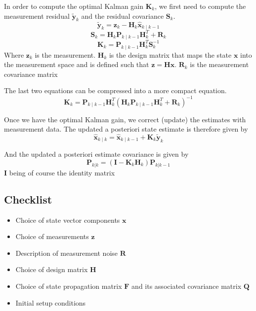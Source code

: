 \documentclass[12pt]{article}
\begin{document}
In order to compute the optimal Kalman gain $\mathbf{K}_k$, we first need to compute the measurement residual $\tilde{\mathbf{y}}_k$ and the residual covariance $\mathbf{S}_k$.
\begin{equation}
\tilde{\mathbf{y}}_k = \mathbf{z}_k - \mathbf{H}_k\hat{\mathbf{x}}_{k\mid k-1}
\end{equation}
\begin{equation}
\mathbf{S}_k = \mathbf{H}_k \mathbf{P}_{k\mid k-1} \mathbf{H}_k^T + \mathbf{R}_k
\end{equation}
\begin{equation}
\mathbf{K}_k = \mathbf{P}_{k\mid k-1}\mathbf{H}_k^T \mathbf{S}_k^{-1}
\end{equation}
Where $\mathbf{z}_k$ is the measurement.
$\mathbf{H}_k$ is the design matrix that maps the state $\mathbf{x}$ into the measurement space and is defined such that $\mathbf{z} = \mathbf{H}\mathbf{x}$.
$\mathbf{R}_k$ is the measurement covariance matrix

The last two equations can be compressed into a more compact equation.
\begin{equation}
\mathbf{K}_k = \mathbf{P}_{k\mid k-1}\mathbf{H}_k^T (\mathbf{H}_k \mathbf{P}_{k\mid k-1} \mathbf{H}_k^T + \mathbf{R}_k)^{-1}
\end{equation}

Once we have the optimal Kalman gain, we correct (update) the estimates with measurement data.
The updated a posteriori state estimate is therefore given by
\begin{equation}
\hat{\mathbf{x}}_{k\mid k} = \hat{\mathbf{x}}_{k\mid k-1} + \mathbf{K}_k\tilde{\mathbf{y}}_k
\end{equation}

And the updated a posteriori estimate covariance is given by
\begin{equation}
\mathbf{P}_{k|k} = (\mathbf{I} - \mathbf{K}_k \mathbf{H}_k) \mathbf{P}_{k|k-1}
\end{equation}
$\mathbf{I}$ being of course the identity matrix

\subsection{Checklist}

\begin{itemize}
\item Choice of state vector components $\mathbf{x}$
\item Choice of measurements $\mathbf{z}$
\item Description of measurement noise $\mathbf{R}$
\item Choice of design matrix $\mathbf{H}$
\item Choice of state propagation matrix $\mathbf{F}$ and its associated covariance matrix $\mathbf{Q}$
\item Initial setup conditions $ $
\end{itemize}
\end{document}
